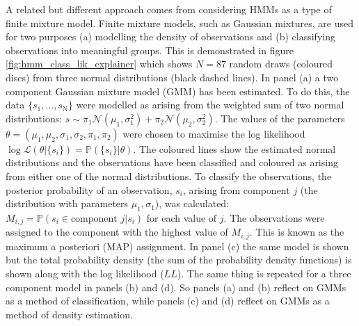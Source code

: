 A related but different approach comes from  considering HMMs as a type of finite mixture model\cite{mclachlanFiniteMixtureModels2000}. Finite mixture models, such as Gaussian mixtures\cite{reynolds2009gaussian}, are used for two purposes (a) modelling the density of observations and (b) classifying observations into meaningful groups\cite{mclachlan1988mixture}. This is demonstrated in figure \ref{fig:hmm_class_lik_explainer} which shows $N = \num{87}$ random draws (coloured discs) from three normal distributions (black dashed lines). In panel (a) a two component Gaussian mixture model (GMM) has been estimated. To do this, the data $\{s_{1}, \ldots, s_{\mathrm{N}}\}$ were modelled as arising from the weighted sum of two normal distributions: $s \sim \pi_{1}\mathcal{N}\left(\mu_{1}, \sigma_{1}^{2}\right) +  \pi_{2}\mathcal{N}\left(\mu_{2}, \sigma_{2}^{2}\right)$. The values of the parameters $\theta = (\mu_{1}, \mu_{2}, \sigma_{1}, \sigma_{2}, \pi_{1}, \pi_{2})$ were chosen to maximise the log likelihood $\log{\mathcal{L}(\theta | \{s_{i}\})} = \mathbb{P}(\{s_{i}\}|\theta)$.  The coloured lines show the estimated normal distributions and the observations have been classified and coloured as arising from either one of the normal distributions. To classify the observations, the posterior probability of an  observation, $s_{i}$, arising from component $j$ (the distribution with parameters $\mu_{1}, \sigma_{1}$), was calculated: $M_{i,j}=\mathbb{P}(s_{i} \in \text{component }j |s_{i})$ for each value of $j$. The observations were assigned to the component with the highest value of $M_{i, j}$. This is known as the maximum a posteriori (MAP) assignment. In panel (c) the same model is shown but the total probability density (the sum of the probability density functions) is shown along with the log likelihood ($LL$). The same thing is repeated for a three component model in panels (b) and (d). So panels (a) and (b) reflect on GMMs as a method of classification, while panels (c) and (d) reflect on GMMs as a method of density estimation. 

